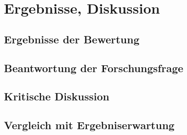 \section{Ergebnisse, Diskussion}

\subsection{Ergebnisse der Bewertung}

\subsection{Beantwortung der Forschungsfrage}

\subsection{Kritische Diskussion}

\subsection{Vergleich mit Ergebniserwartung}
